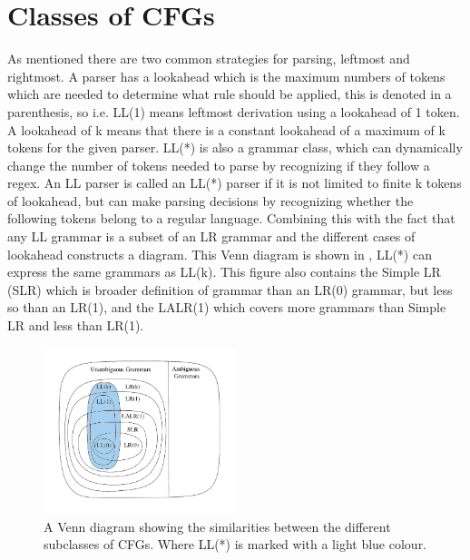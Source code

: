 \section{Classes of CFGs}
As mentioned there are two common strategies for parsing, leftmost and rightmost. 
A parser has a lookahead which is the maximum numbers of tokens which are needed to determine what rule should be applied, this is denoted in a parenthesis, so i.e. LL(1) means leftmost derivation using a lookahead of 1 token. 
A lookahead of k means that there is a constant lookahead of a maximum of k tokens for the given parser. 
LL(*) is also a grammar class, which can dynamically change the number of tokens needed to parse by recognizing if they follow a \acrlong{regex}.
An LL parser is called an LL(*) parser if it is not limited to finite k tokens of lookahead, but can make parsing decisions by recognizing whether the following tokens belong to a regular language.
Combining this with the fact that any LL grammar is a subset of an LR grammar and the different cases of lookahead constructs a diagram. 
This Venn diagram is shown in , LL(*) can express the same grammars as LL(k).
This figure also contains the Simple LR (SLR) which is broader definition of grammar than an LR(0) grammar, but less so than an LR(1), and the LALR(1) which covers more grammars than Simple LR and less than LR(1). 
\begin{figure}[!ht]
\centering
 \includegraphics[width=0.5\textwidth]{figures/classesofgrammars.png} %
\caption{A Venn diagram showing the similarities between the different subclasses of CFGs. Where LL(*) is marked with a light blue colour. \citep{Lecture5}}
\label{fig:hierarchyofgrammars}
\vspace{-15pt}
\end{figure}
